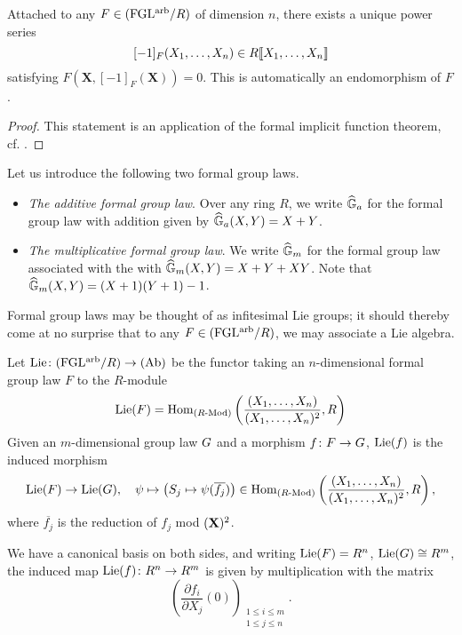 \documentclass[../main.tex]{subfiles}
\begin{document}
\begin{lem}\label{lem:FGLAdditive}
    Attached to any $F \in {(\mathrm{FGL^{arb}}/{R})}$ of dimension $n$, there exists
      a unique power series 
      $$[-1]_F(X_1, \dots, X_n) \in R\llbracket X_1, \dots, X_n\rrbracket$$
      satisfying $F(\mathbf X, [-1]_F(\mathbf X)) = 0$. This is automatically
      an endomorphism of $F$. 
\end{lem}
\begin{proof}
    This statement is an application of the formal implicit function theorem,
    cf. \cite[Theorem A.4.7]{hazewinkel1978formal}.   
\end{proof}

\begin{xpl} Let us introduce the following two formal group laws.
  \begin{itemize}
    \item \textit{The additive formal group law}. Over any ring $R$, we write 
      $\widehat{\mathbb{G}}_a$ for the formal group law with addition given by 
      $\widehat{\mathbb{G}}_a(X,Y) = X + Y$. 
    \item \textit{The multiplicative formal group law}. We write $\widehat{\mathbb{G}}_m$ for
      the formal group law associated with the with $\widehat{\mathbb{G}}_m(X,Y) = X + Y +
      XY$. Note that $\widehat{\mathbb{G}}_m(X,Y) = (X+1)(Y+1) - 1$. 
  \end{itemize}
\end{xpl}

Formal group laws may be thought of as infitesimal Lie groups; it should
thereby come at no surprise that to
any $F \in {(\mathrm{FGL^{arb}}/{R})}$, we may associate a Lie algebra. 

\begin{defi}
Let $\operatorname{Lie}\colon {(\mathrm{FGL^{arb}}/{R})} \to {(\mathrm{Ab})}$ be the functor taking an $n$-dimensional 
formal group law $F$ to the $R$-module
\begin{equation*}
  \operatorname{Lie}({F}) = \operatorname{Hom}_{{({R}\textnormal-\allowbreak\mathrm{Mod})}} \left( \frac{(X_1, \dots, X_n)}{(X_1, \dots,
  X_n)^2}, R \right) 
\end{equation*}
Given an $m$-dimensional group law ${G}$ and a morphism ${f}\colon {F} \to
{G}$, $\operatorname{Lie}({f})$ is the induced morphism
\begin{equation*}
  \operatorname{Lie}({F}) \to \operatorname{Lie}({G}), \quad \psi \mapsto \left( S_j \mapsto \psi
  (\overline{f_j})\right) \in 
  \operatorname{Hom}_{({R}\textnormal-\allowbreak\mathrm{Mod})}\left(\frac{(X_1, \dots, X_n)}{(X_1, \dots, X_n)^2}, R \right),
\end{equation*}
where $\overline{ f_j}$ is the reduction of $f_j$ mod $(\mathbf{X})^2$. 
\end{defi}
We have a canonical basis on both sides, and writing $\operatorname{Lie}({F}) = R^n$, 
$\operatorname{Lie}({G}) \cong R^m$, the induced map $\operatorname{Lie}({f}) \colon R^n \to R^m$ is
given by multiplication with the matrix 
\begin{equation*}
  \left( \frac {\partial f_i}{\partial X_j} (0) \right)_{\substack{1 \leq i \leq m \\ 1 \leq j \leq n}}.
\end{equation*}
\end{document}
